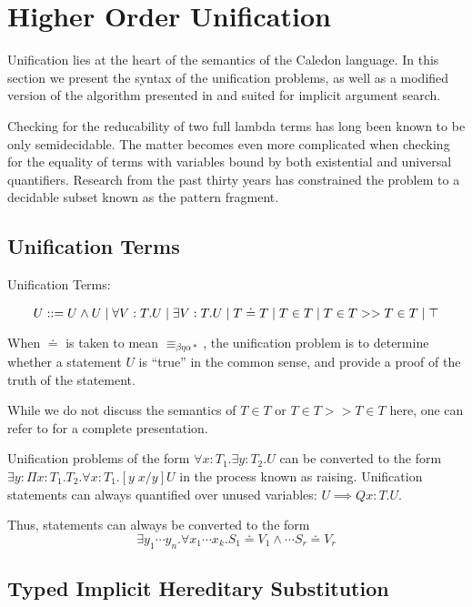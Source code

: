 \section{Higher Order Unification}

Unification lies at the heart of the semantics of the Caledon language.  
In this section we present the syntax of the unification problems, as well as a modified version of the algorithm 
presented in \citep{pfenning1991logic} and \citep{pfenning1991unification} suited for implicit argument search.

Checking for the reducability of two full lambda terms has long been known to be only semidecidable.  
The matter becomes even more complicated when checking for the equality of terms with variables bound
by both existential and universal quantifiers.  Research from the past thirty years has constrained
the problem to a decidable subset known as the pattern fragment.

\subsection{Unification Terms}

\begin{definition}
Unification Terms:

\[
U ::= U \wedge U 
 \; | \; \forall V : T . U
 \; | \; \exists V : T . U 
 \; | \; T \doteq T
 \; | \; T \in T
 \; | \; T \in T >> T \in T
 \; | \; \top
\]
\label{def:hou:syn}
\end{definition}

When $\doteq$ is taken to mean $\equiv_{\beta\eta\alpha*}$, the unification problem is to determine 
whether a statement $U$ is ``true'' in the common sense, and provide a proof of the truth of the statement. 

While we do not discuss the semantics of $T \in T$ or $T \in T >> T \in T$ here, 
one can refer to \citep{pfenning1991logic} for a complete presentation.

Unification problems of the form 
$\forall x : T_1 . \exists y : T_2 . U $ can be converted to the form
$\exists y : \Pi x : T_1 . T_2 . \forall x : T_1 . [y\; x / y ]U $ 
in the process known as raising. Unification
statements can always quantified over unused variables: $U \implies Q x : T . U$.  

Thus, statements can always be converted to the form
\[
\exists y_1 \cdots y_n . \forall x_1 \cdots x_k . S_1 \doteq V_1 \wedge \cdots S_r \doteq V_r
\]

\subsection{Typed Implicit Hereditary Substitution}

